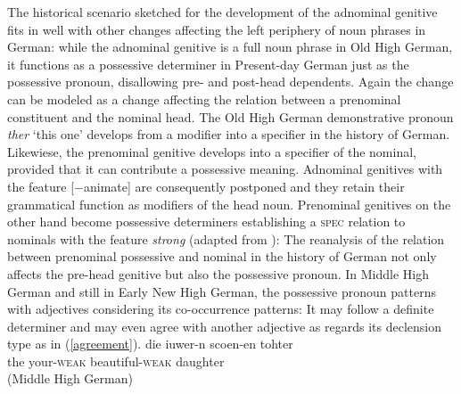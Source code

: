 \documentclass[output=paper
	        ,collection
	        ,collectionchapter
 	        ,biblatex
                ,babelshorthands
                ,newtxmath
                ,draftmode
                ,colorlinks, citecolor=brown
]{./langsci/langscibook}
\begin{document}
The historical scenario sketched for the development of the adnominal genitive fits in well with other changes affecting the left periphery of noun phrases in German: while the adnominal genitive is a full noun phrase in Old High German, it functions as a possessive determiner in Present-day German just as the possessive pronoun, disallowing pre- and post-head dependents. Again the change can be modeled as a change affecting the relation between a prenominal constituent and the nominal head. The Old High German demonstrative pronoun \textit{ther} `this one' develops from a modifier into a specifier in the history of German. Likewiese, the prenominal genitive develops into a specifier of the nominal, provided that it can contribute a possessive meaning. Adnominal genitives with the feature [$-$animate] are consequently postponed and they retain their grammatical function as modifiers of the head noun. Prenominal genitives on the other hand become possessive determiners establishing a \textsc{spec} relation to nominals with the \decl feature \textit{strong} (adapted from \cite[54]{PoSa94}):
\ea 
{}
\z 
The reanalysis of the relation between prenominal possessive and nominal in the history of German not only affects the pre-head genitive but also the possessive pronoun. In Middle High German and still in Early New High German, the possessive pronoun patterns with adjectives considering its co-occurrence patterns: It may follow a definite determiner and may even agree with another adjective as regards its declension type as in (\ref{agreement}). 
\eal
\ex \label{agreement}
\gll  die iuwer-n scoen-en tohter \\ the your-\textsc{weak} beautiful-\textsc{weak} daughter  \\ \hfill (Middle High German)
\end{document}
